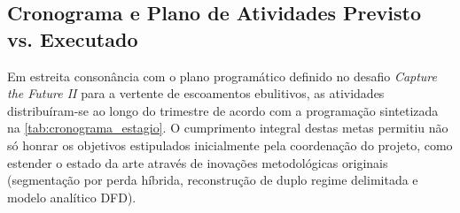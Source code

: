 \subsection{Cronograma e Plano de Atividades Previsto vs. Executado}
\label{subsec:cronograma_trabalho}

Em estreita consonância com o plano programático definido no desafio \emph{Capture the Future II} para a vertente de escoamentos ebulitivos, as atividades distribuíram-se ao longo do trimestre de acordo com a programação sintetizada na \autoref{tab:cronograma_estagio}. O cumprimento integral destas metas permitiu não só honrar os objetivos estipulados inicialmente pela coordenação do projeto, como estender o estado da arte através de inovações metodológicas originais (segmentação por perda híbrida, reconstrução de duplo regime delimitada e modelo analítico DFD).

